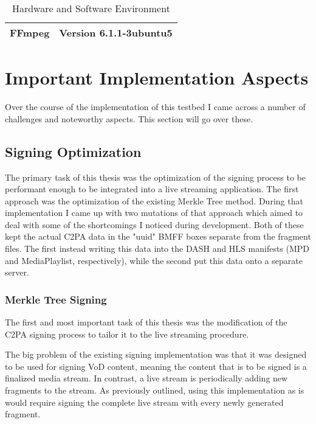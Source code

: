 \begin{table}[H]
\begin{tabular}{l|cll|}
        \multicolumn{1}{|l|}{\textbf{FFmpeg}}                                                      & \multicolumn{3}{c|}{Version 6.1.1-3ubuntu5}                                                                                                                                                                                                           \\ \hline
    \end{tabular}
    \caption{Hardware and Software Environment}
    \label{tab:env}
\end{table}

\section{Important Implementation Aspects\label{sec:implaspects}}

Over the course of the implementation of this testbed I came across a number of challenges and noteworthy aspects. This section will go over these.

\subsection{Signing Optimization\label{sec:optimization}}

The primary task of this thesis was the optimization of the signing process to be performant enough to be integrated into a live streaming application. The first approach was the optimization of the existing Merkle Tree method. During that implementation I came up with two mutations of that approach which aimed to deal with some of the shortcomings I noticed during development. Both of these kept the actual C2PA data in the "uuid" BMFF boxes separate from the fragment files. The first instead writing this data into the DASH and HLS manifests (MPD and MediaPlaylist, respectively), while the second put this data onto a separate server.

\subsubsection{Merkle Tree Signing\label{sec:merkle_opt}}

The first and most important task of this thesis was the modification of the C2PA signing process to tailor it to the live streaming procedure.

The big problem of the existing signing implementation was that it was designed to be used for signing VoD content, meaning the content that is to be signed is a finalized media stream. In contrast, a live stream is periodically adding new fragments to the stream. As previously outlined, using this implementation as is would require signing the complete live stream with every newly generated fragment.

